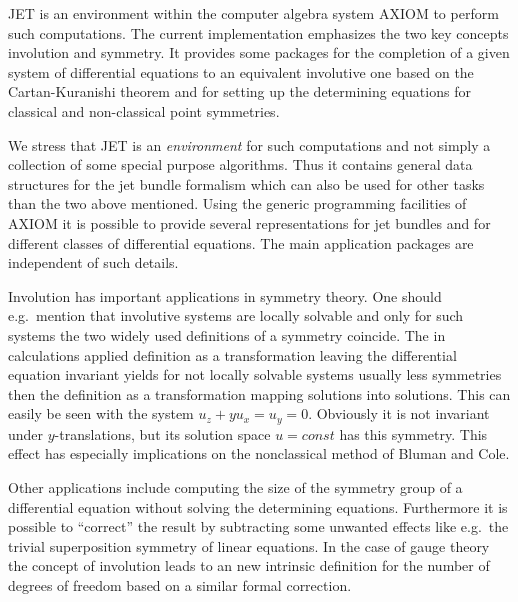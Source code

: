 \documentclass[12pt,a4paper]{article}
\begin{document}
{\small JET} is an environment within the computer algebra system {\small AXIOM}
to perform such computations. The current implementation emphasizes the two key
concepts involution and symmetry. It provides some packages for the completion
of a given system of differential equations to an equivalent involutive one
based on the Cartan-Kuranishi theorem and for setting up the determining
equations for classical and non-classical point symmetries.

We stress that {\small JET} is an {\em environment\/} for such computations and
not simply a collection of some special purpose algorithms. Thus it contains
general data structures for the jet bundle formalism which can also be used for
other tasks than the two above mentioned. Using the generic programming
facilities of {\small AXIOM} it is possible to provide several representations
for jet bundles and for different classes of differential equations. The main
application packages are independent of such details.

Involution has important applications in symmetry theory. One should e.g.\
mention that involutive systems are locally solvable and only for such systems
the two widely used definitions of a symmetry coincide. The in calculations
applied definition as a transformation leaving the differential equation
invariant yields for not locally solvable systems usually less symmetries then
the definition as a transformation mapping solutions into solutions.  This can
easily be seen with the system $u_{z}+yu_{x}=u_{y}=0$. Obviously it is not
invariant under $y$-translations, but its solution space $u=const$ has this
symmetry. This effect has especially implications on the nonclassical method of
Bluman and Cole.

Other applications include computing the size of the symmetry group of a
differential equation without solving the determining equations. Furthermore it
is possible to ``correct'' the result by subtracting some unwanted effects like
e.g.\ the trivial superposition symmetry of linear equations. In the case of
gauge theory the concept of involution leads to an new intrinsic definition for
the number of degrees of freedom based on a similar formal correction.
\end{document}

